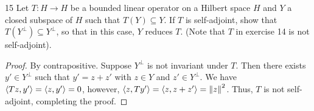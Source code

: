 \begin{exercise}{15}
Let $T: H \to H$ be a bounded linear operator on a Hilbert space $H$ and $Y$ a closed subspace of $H$ such that $T(Y) \subseteq Y$.
If $T$ is self-adjoint, show that $T(Y^\perp) \subseteq Y^\perp$, so that in this case, $Y$ reduces $T$.
(Note that $T$ in exercise 14 is not self-adjoint).
\end{exercise}
\begin{proof}
By contrapositive. 
Suppose $Y^\perp$ is not invariant under $T$.
Then there exists $y' \in Y^\perp$ such that $y' = z + z'$ with $z \in Y$ and $z' \in Y^\perp$.
We have $\langle Tz, y'\rangle = \langle z, y'\rangle = 0$, however, $\langle z, Ty'\rangle = \langle z, z + z'\rangle = \left\lVert z\right\rVert^2$.
Thus, $T$ is not self-adjoint, completing the proof.
\end{proof} 
